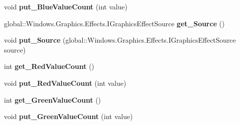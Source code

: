 \begin{DoxyCompactItemize}
\mbox{\label{interface_microsoft_1_1_graphics_1_1_canvas_1_1_effects_1_1_i_posterize_effect_acb054082d410566df8555984b43083e3}} 
void {\bfseries put\+\_\+\+Blue\+Value\+Count} (int value)
\item 
\mbox{\label{interface_microsoft_1_1_graphics_1_1_canvas_1_1_effects_1_1_i_posterize_effect_ad8560a10045dace88399b7e9cfa15ee8}} 
global\+::\+Windows.\+Graphics.\+Effects.\+I\+Graphics\+Effect\+Source {\bfseries get\+\_\+\+Source} ()
\item 
\mbox{\label{interface_microsoft_1_1_graphics_1_1_canvas_1_1_effects_1_1_i_posterize_effect_a543f2c579f0144304e21973d15de997a}} 
void {\bfseries put\+\_\+\+Source} (global\+::\+Windows.\+Graphics.\+Effects.\+I\+Graphics\+Effect\+Source source)
\item 
\mbox{\label{interface_microsoft_1_1_graphics_1_1_canvas_1_1_effects_1_1_i_posterize_effect_a5260ca6c96d8f98738514377bc0e68fd}} 
int {\bfseries get\+\_\+\+Red\+Value\+Count} ()
\item 
\mbox{\label{interface_microsoft_1_1_graphics_1_1_canvas_1_1_effects_1_1_i_posterize_effect_a265ff7db0fe2c42877b0078b06751fce}} 
void {\bfseries put\+\_\+\+Red\+Value\+Count} (int value)
\item 
\mbox{\label{interface_microsoft_1_1_graphics_1_1_canvas_1_1_effects_1_1_i_posterize_effect_acd9942aba27fe9a434f9fa185bff2fa1}} 
int {\bfseries get\+\_\+\+Green\+Value\+Count} ()
\item 
\mbox{\label{interface_microsoft_1_1_graphics_1_1_canvas_1_1_effects_1_1_i_posterize_effect_ac09d8d848260691f6e42b706aa4e2497}} 
void {\bfseries put\+\_\+\+Green\+Value\+Count} (int value)
\item 

\end{DoxyCompactItemize}
